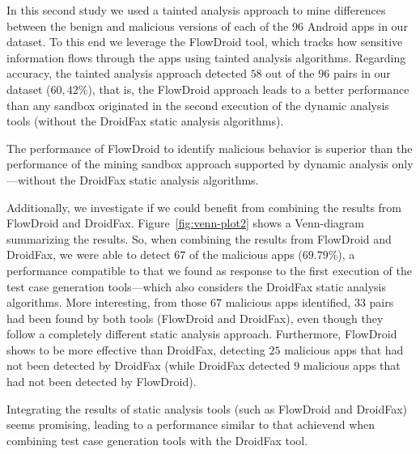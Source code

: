 In this second study we used a tainted analysis approach to mine differences between the benign and malicious versions of each of the 96 Android apps in our dataset. To this end we leverage the FlowDroid tool, which tracks how sensitive information flows through the apps using tainted analysis algorithms. Regarding accuracy, the tainted analysis approach detected $58$ out of the $96$ pairs in our dataset ($60,42$\%), that is, the FlowDroid approach leads to a better performance than any sandbox originated in the second execution of the dynamic analysis tools (without the DroidFax static analysis algorithms).

\begin{finding}
  The performance of FlowDroid to identify malicious behavior
  is superior than the performance of the
  mining sandbox approach supported by dynamic analysis only---without
  the DroidFax static analysis algorithms.
\end{finding}

Additionally, we investigate if we could benefit from combining
the results from FlowDroid and DroidFax. Figure~\ref{fig:venn-plot2} shows a
Venn-diagram summarizing the results. So, when combining
the results from FlowDroid and DroidFax, we were able to detect
$67$ of the malicious apps ($69.79$\%), a performance compatible
to that we found as response to the first execution of the
test case generation tools---which also considers the DroidFax
static analysis algorithms. More interesting, from those $67$
malicious apps identified, $33$ pairs had been found by
both tools (FlowDroid and DroidFax), even though they follow
a completely different static analysis approach. Furthermore,
FlowDroid shows to be more effective than DroidFax, detecting $25$ malicious
apps that had not been detected by DroidFax (while DroidFax detected $9$
malicious apps that had not been detected by FlowDroid).

\begin{finding}
  Integrating the results of static analysis tools
  (such as FlowDroid and DroidFax) seems promising,
  leading to a performance similar to that achievend
  when combining test case generation tools with the
  DroidFax tool. 
\end{finding}


